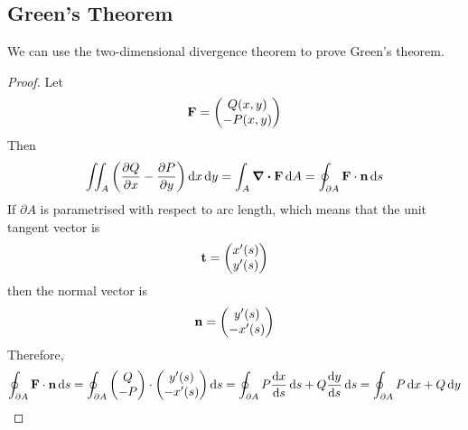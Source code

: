 \documentclass{article}
\begin{document}
\subsection{Green's Theorem}
We can use the two-dimensional divergence theorem to prove Green's theorem.
\begin{proof}
    Let
    \[ \vb F = \begin{pmatrix}
            Q(x, y) \\ -P(x, y)
        \end{pmatrix} \]
    Then
    \[ \iint_A \left( \pdv{Q}{x} - \pdv{P}{y} \right) \dd{x}\dd{y} = \int_A \div{\vb F} \dd{A} = \oint_{\partial A} \vb F \cdot \vb n \dd{s} \]
    If $\partial A$ is parametrised with respect to arc length, which means that the unit tangent vector is
    \[ \vb t = \begin{pmatrix}
            x'(s) \\ y'(s)
        \end{pmatrix} \]
    then the normal vector is
    \[ \vb n = \begin{pmatrix}
            y'(s) \\ -x'(s)
        \end{pmatrix} \]
    Therefore,
    \[ \oint_{\partial A} \vb F \cdot \vb n \dd{s} = \oint_{\partial A} \begin{pmatrix}
            Q \\ -P
        \end{pmatrix} \cdot \begin{pmatrix}
            y'(s) \\ -x'(s)
        \end{pmatrix} \dd{s} = \oint_{\partial A} P \dv{x}{s} \dd{s} + Q \dv{y}{s} \dd{s} = \oint_{\partial A} P \dd{x} + Q \dd{y} \]
\end{proof}
\end{document}
